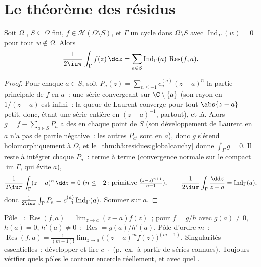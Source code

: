 \section{Le théorème des résidus}

\begin{theorem}\label{thm:b3:residues:residue}
Soit $\Omega$ , $S \subseteq \Omega$ fini, $f \in
\mathcal H(\Omega\setminus S)$, et $\Gamma$ un cycle dans
$\Omega\setminus S$ avec $\operatorname{Ind}_\Gamma(w) = 0$
pour tout $w \notin \Omega$. Alors
\[
\frac{1}{2\iu\pi}\int_\Gamma f(z)\,\dd z
= \sum_{a\in S}\operatorname{Ind}_\Gamma(a)\,
\operatorname{Res}(f, a) .
\]
\end{theorem}

\begin{proof}
Pour chaque $a \in S$, soit $P_a(z) =
\sum_{n\leq-1}c_n^{(a)}(z - a)^n$ la partie principale de
$f$ en $a$~: une série convergeant sur $\C\setminus\{a\}$
(son rayon en $1/(z-a)$ est infini~: la queue de Laurent
converge pour tout $\abs{z-a}$ petit, donc, étant une série
entière en $(z-a)^{-1}$, partout), et  là. Alors
$g = f - \sum_{a\in S}P_a$ a des  en
chaque point de $S$ (son développement de Laurent en $a$ n'a
pas de partie négative~: les autres $P_{a'}$ sont
 en $a$), donc $g$ s'étend holomorphiquement à
$\Omega$, et le~\cref{thm:b3:residues:globalcauchy} donne
$\int_\Gamma g = 0$. Il reste à intégrer chaque $P_a$~: terme
à terme (convergence normale sur le compact
$\operatorname{im}\Gamma$, qui évite $a$),
\[
\frac1{2\iu\pi}\int_\Gamma(z - a)^n\,\dd z = 0 \ (n \leq -2:
\text{primitive } \tfrac{(z-a)^{n+1}}{n+1}),
\qquad
\frac1{2\iu\pi}\int_\Gamma\frac{\dd z}{z - a} =
\operatorname{Ind}_\Gamma(a),
\]
donc $\frac1{2\iu\pi}\int_\Gamma P_a =
c_{-1}^{(a)}\operatorname{Ind}_\Gamma(a)$. Sommer sur $a$.
\end{proof}

\begin{method}\label{met:b3:residues:compute}
Pôle ~: $\operatorname{Res}(f, a) = \lim_{z\to a}(z -
a)f(z)$~; pour $f = g/h$ avec $g(a) \neq 0$, $h(a) = 0$,
$h'(a) \neq 0$~: $\operatorname{Res} = g(a)/h'(a)$. Pôle
d'ordre $m$~: $\operatorname{Res}(f, a) =
\frac1{(m-1)!}\lim_{z\to a}\bigl((z-a)^mf(z)\bigr)^{(m-1)}$.
Singularités essentielles~: développer et lire $c_{-1}$ (p.\
ex.\ à partir de séries connues). Toujours vérifier quels
pôles le contour encercle réellement, et avec quel .
\end{method}

